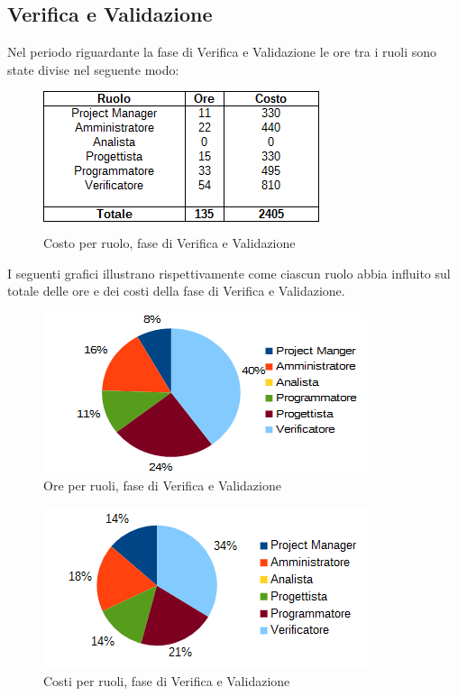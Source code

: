 	\subsection{Verifica e Validazione}
	Nel periodo riguardante la fase di Verifica e Validazione le ore tra i ruoli sono state divise nel seguente modo: \\
	\begin{figure}[H]
		\centering
		\includegraphics[scale=0.75]{immagini/tabelle/validazione-costo.png}
		\caption{Costo per ruolo, fase di Verifica e Validazione}
	\end{figure}
	I seguenti grafici illustrano rispettivamente come ciascun ruolo abbia influito sul totale
delle ore e dei costi della fase di Verifica e Validazione. \\
	\begin{figure}[H]
		\centering
		\includegraphics[scale=1]{immagini/grafici/validazione-torta.png}
		\caption{Ore per ruoli, fase di Verifica e Validazione}
	\end{figure}
	\begin{figure}[H]
		\centering
		\includegraphics[scale=1]{immagini/grafici/validazione-torta-costo.png}
		\caption{Costi per ruoli, fase di Verifica e Validazione}
	\end{figure}
